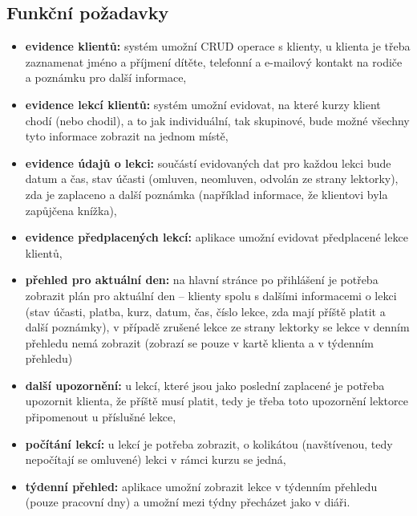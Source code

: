     \subsection{Funkční požadavky}
    \begin{itemize}
        \item \textbf{evidence klientů:} systém umožní CRUD operace s klienty, u klienta je třeba zaznamenat jméno a příjmení dítěte, telefonní a e-mailový kontakt na rodiče a poznámku pro další informace,
        \item \textbf{evidence lekcí klientů:} systém umožní evidovat, na které kurzy klient chodí (nebo chodil), a to jak individuální, tak skupinové, bude možné všechny tyto informace zobrazit na jednom místě,
        \item \textbf{evidence údajů o lekci:} součástí evidovaných dat pro každou lekci bude datum a čas, stav účasti (omluven, neomluven, odvolán ze strany lektorky), zda je zaplaceno a další poznámka (například informace, že klientovi byla zapůjčena knížka),
        \item \textbf{evidence předplacených lekcí:} aplikace umožní evidovat předplacené lekce klientů,
        \item \textbf{přehled pro aktuální den:} na hlavní stránce po přihlášení je potřeba zobrazit plán pro aktuální den -- klienty spolu s dalšími informacemi o lekci (stav účasti, platba, kurz, datum, čas, číslo lekce, zda mají příště platit a další poznámky), v případě zrušené lekce ze strany lektorky se lekce v denním přehledu nemá zobrazit (zobrazí se pouze v kartě klienta a v týdenním přehledu)
        \item \textbf{další upozornění:} u lekcí, které jsou jako poslední zaplacené je potřeba upozornit klienta, že příště musí platit, tedy je třeba toto upozornění lektorce připomenout u příslušné lekce,
        \item \textbf{počítání lekcí:} u lekcí je potřeba zobrazit, o kolikátou (navštívenou, tedy nepočítají se omluvené) lekci v rámci kurzu se jedná,
        \item \textbf{týdenní přehled:} aplikace umožní zobrazit lekce v týdenním přehledu (pouze pracovní dny) a umožní mezi týdny přecházet jako v diáři.
    \end{itemize}
    
